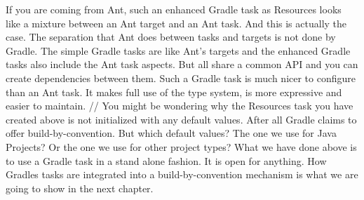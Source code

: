 If you are coming from Ant, such an enhanced Gradle task as Resources looks like a mixture between an Ant target and an Ant task. And this is actually the case. The separation that Ant does between tasks and targets is not done by Gradle. The simple Gradle tasks are like Ant's targets and the enhanced Gradle tasks also include the Ant task aspects. But all share a common API and you can create dependencies between them. Such a Gradle task is much nicer to configure than an Ant task. It makes full use of the type system, is more expressive and easier to maintain.
//
You might be wondering why the Resources task you have created above is not initialized with any default values. After all Gradle claims to offer build-by-convention. But which default values? The one we use for Java Projects? Or the one we use for other project types? What we have done above is to use a Gradle task in a stand alone fashion. It is open for anything. How Gradles tasks are integrated into a build-by-convention mechanism is what we are going to show in the next chapter.


